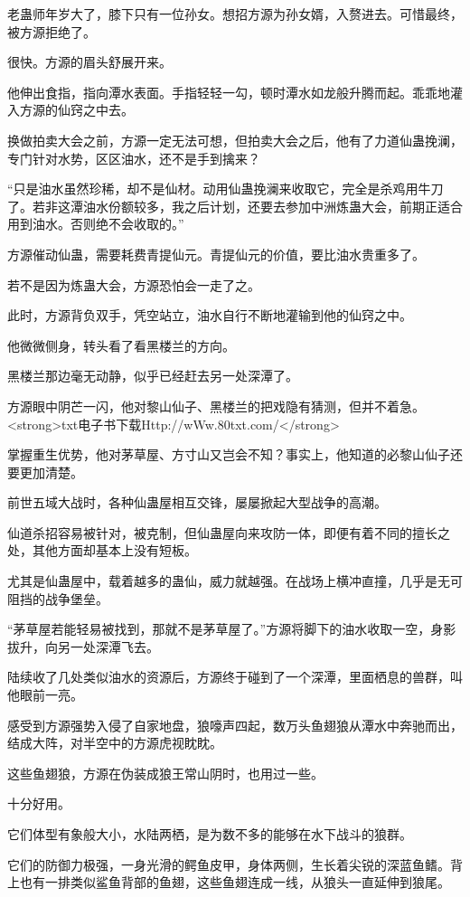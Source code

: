 \begin{this_body}
老蛊师年岁大了，膝下只有一位孙女。想招方源为孙女婿，入赘进去。可惜最终，被方源拒绝了。

很快。方源的眉头舒展开来。

他伸出食指，指向潭水表面。手指轻轻一勾，顿时潭水如龙般升腾而起。乖乖地灌入方源的仙窍之中去。

换做拍卖大会之前，方源一定无法可想，但拍卖大会之后，他有了力道仙蛊挽澜，专门针对水势，区区油水，还不是手到擒来？

“只是油水虽然珍稀，却不是仙材。动用仙蛊挽澜来收取它，完全是杀鸡用牛刀了。若非这潭油水份额较多，我之后计划，还要去参加中洲炼蛊大会，前期正适合用到油水。否则绝不会收取的。”

方源催动仙蛊，需要耗费青提仙元。青提仙元的价值，要比油水贵重多了。

若不是因为炼蛊大会，方源恐怕会一走了之。

此时，方源背负双手，凭空站立，油水自行不断地灌输到他的仙窍之中。

他微微侧身，转头看了看黑楼兰的方向。

黑楼兰那边毫无动静，似乎已经赶去另一处深潭了。

方源眼中阴芒一闪，他对黎山仙子、黑楼兰的把戏隐有猜测，但并不着急。<strong>txt电子书下载Http://wWw.80txt.com/</strong>

掌握重生优势，他对茅草屋、方寸山又岂会不知？事实上，他知道的必黎山仙子还要更加清楚。

前世五域大战时，各种仙蛊屋相互交锋，屡屡掀起大型战争的高潮。

仙道杀招容易被针对，被克制，但仙蛊屋向来攻防一体，即便有着不同的擅长之处，其他方面却基本上没有短板。

尤其是仙蛊屋中，载着越多的蛊仙，威力就越强。在战场上横冲直撞，几乎是无可阻挡的战争堡垒。

“茅草屋若能轻易被找到，那就不是茅草屋了。”方源将脚下的油水收取一空，身影拔升，向另一处深潭飞去。

陆续收了几处类似油水的资源后，方源终于碰到了一个深潭，里面栖息的兽群，叫他眼前一亮。

感受到方源强势入侵了自家地盘，狼嚎声四起，数万头鱼翅狼从潭水中奔驰而出，结成大阵，对半空中的方源虎视眈眈。

这些鱼翅狼，方源在伪装成狼王常山阴时，也用过一些。

十分好用。

它们体型有象般大小，水陆两栖，是为数不多的能够在水下战斗的狼群。

它们的防御力极强，一身光滑的鳄鱼皮甲，身体两侧，生长着尖锐的深蓝鱼鳍。背上也有一排类似鲨鱼背部的鱼翅，这些鱼翅连成一线，从狼头一直延伸到狼尾。


\end{this_body}
